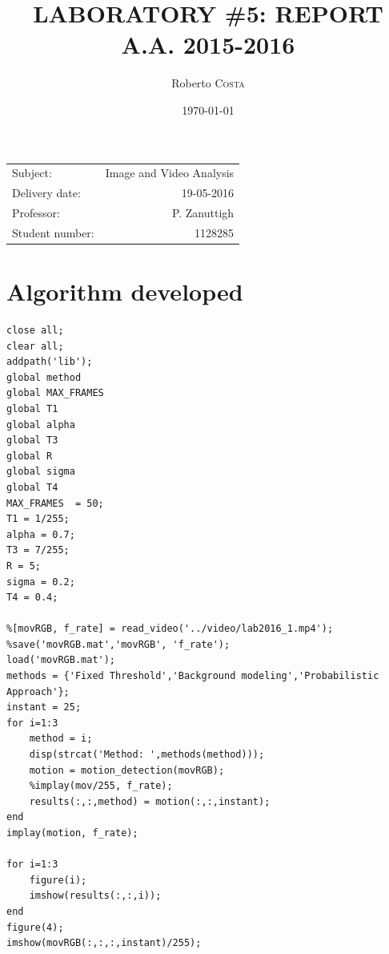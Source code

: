 \documentclass[11pt]{article}
\title{LABORATORY \#5: REPORT \\ A.A. 2015-2016}
\author{Roberto \textsc{Costa}} %
\date{\today}
\begin{document}
\maketitle
\begin{center}
\begin{tabular}{l r}
Subject: & Image and Video Analysis\\
Delivery date: & 19-05-2016 \\ 
Professor: & P. Zanuttigh \\
Student number: & 1128285
\end{tabular}
\end{center}



\section{Algorithm developed}
\begin{lstlisting}
close all;
clear all;
addpath('lib');
global method
global MAX_FRAMES
global T1
global alpha
global T3
global R
global sigma
global T4
MAX_FRAMES  = 50;
T1 = 1/255;
alpha = 0.7;
T3 = 7/255;
R = 5;
sigma = 0.2;
T4 = 0.4;

%[movRGB, f_rate] = read_video('../video/lab2016_1.mp4');
%save('movRGB.mat','movRGB', 'f_rate');
load('movRGB.mat');
methods = {'Fixed Threshold','Background modeling','Probabilistic Approach'};
instant = 25;
for i=1:3
    method = i;
    disp(strcat('Method: ',methods(method)));
    motion = motion_detection(movRGB);
    %implay(mov/255, f_rate);
    results(:,:,method) = motion(:,:,instant);
end
implay(motion, f_rate);

for i=1:3
    figure(i);
    imshow(results(:,:,i));
end
figure(4);
imshow(movRGB(:,:,:,instant)/255);
\end{lstlisting}
\end{document}

